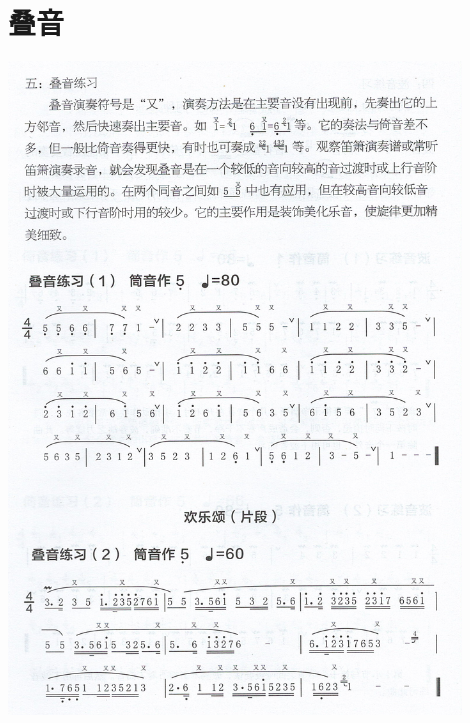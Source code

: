 \documentclass[cn,pad,twocol]{elegantbook}
\begin{document}
\section{叠音}                  \includegraphics[width=0.9\textwidth]{dongxiao/Scan 11.jpeg}
\end{document}
